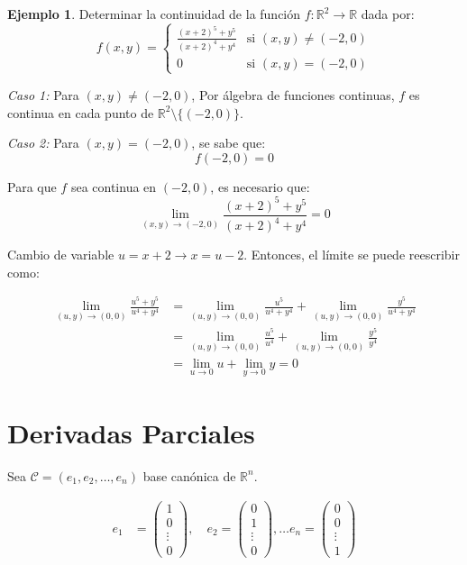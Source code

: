 \documentclass{article}
\newcommand{\R}{\mathbb{R}}
\theoremstyle{definition}
\newtheorem{example}[definition]{Ejemplo}
\theoremstyle{plain}
\theoremstyle{remark}
\theoremstyle{corollary}
\begin{document}
\begin{example}
Determinar la continuidad de la función $f : \R^2 \to \R$ dada por:
\[
f(x, y) = \begin{cases}
\frac{(x + 2)^5 + y^5}{(x + 2)^4 + y^4} & \text{si } (x, y) \neq (-2, 0) \\
0 & \text{si } (x, y) = (-2, 0)
\end{cases}
\]

\textit{Caso 1:} Para $(x, y) \neq (-2, 0)$, Por álgebra de funciones continuas, $f$ es continua en cada punto de $\R^2 \setminus \{(-2, 0)\}$.

\textit{Caso 2:} Para $(x, y) = (-2, 0)$, se sabe que:
\[
f(-2, 0) = 0
\]

Para que $f$ sea continua en $(-2, 0)$, es necesario que:
\[
\lim_{(x, y) \to (-2, 0)} \frac{(x + 2)^5 + y^5}{(x + 2)^4 + y^4} = 0
\]

Cambio de variable $u = x + 2 \rightarrow x = u - 2$. Entonces, el límite se puede reescribir como:

\begin{align*}
\lim_{(u, y) \to (0, 0)} \frac{u^5 + y^5}{u^4 + y^4} &= \lim_{( u, y) \to (0, 0)} \frac{u^5}{u^4 + y^4} + \lim_{(u, y) \to (0, 0)} \frac{y^5}{u^4 + y^4} \\
&= \lim_{(u, y) \to (0, 0)} \frac{u^5}{u^4} + \lim_{(u, y) \to (0, 0)} \frac{y^5}{y^4} \\
&= \lim_{u \to 0} u + \lim_{y \to 0} y = 0
\end{align*}

\end{example}

\section{Derivadas Parciales}


Sea $\mathcal{C} = (e_1, e_2, \ldots, e_n)$ base canónica de $\R^n$.

\begin{align*}
e_1 &= \begin{pmatrix}
1 \\
0 \\
\vdots \\
0
\end{pmatrix}, \quad
e_2 = \begin{pmatrix}
0 \\
1 \\
\vdots \\
0
\end{pmatrix}, \ldots
e_n = \begin{pmatrix}
0 \\
0 \\
\vdots \\
1
\end{pmatrix}
\end{align*}
\end{document}
